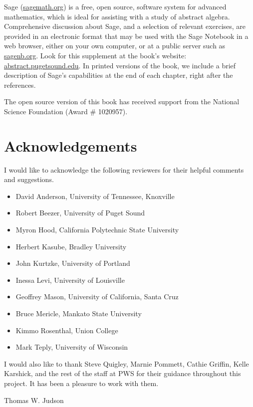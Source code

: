 Sage (\url{sagemath.org}) is a free, open source, software system
for advanced mathematics, which is ideal for assisting with a study
of abstract algebra. Comprehensive discussion about Sage, and a
selection of relevant exercises, are provided in an electronic
format that may be used with the Sage Notebook in a web browser,
either on your own computer, or at a public server such as
\url{sagenb.org}.  Look for this supplement at the book's
website: \url{abstract.pugetsound.edu}.  In printed
versions of the book, we include a brief description of Sage's
capabilities at the end of each chapter, right after the references.

The open source version of this book has received support from the National Science Foundation (Award \# 1020957).

\section*{Acknowledgements}

I would like to acknowledge the following reviewers for their helpful
comments and suggestions. 
\begin{itemize}
 
\item
David Anderson,
University of Tennessee, Knoxville

\item
Robert Beezer,
University of Puget Sound

\item
Myron Hood,
California Polytechnic State University

\item
Herbert Kasube,
Bradley University

\item
John Kurtzke,
University of Portland
 
\item
Inessa Levi,
University of Louisville
 
\item
Geoffrey Mason,
University of California, Santa Cruz

\item
Bruce Mericle,
Mankato State University
 
\item
Kimmo Rosenthal,
Union College

\item
Mark Teply,
University of Wisconsin

\end{itemize}
I would also like to thank Steve Quigley, Marnie Pommett, Cathie
Griffin, Kelle Karshick, and the rest of the staff at PWS for their
guidance throughout this project. It has been a pleasure to work with
them. 

 
\begin{flushright}
Thomas W. Judson
\end{flushright}
 
 
\pagestyle{headings}
 
 
 
 
